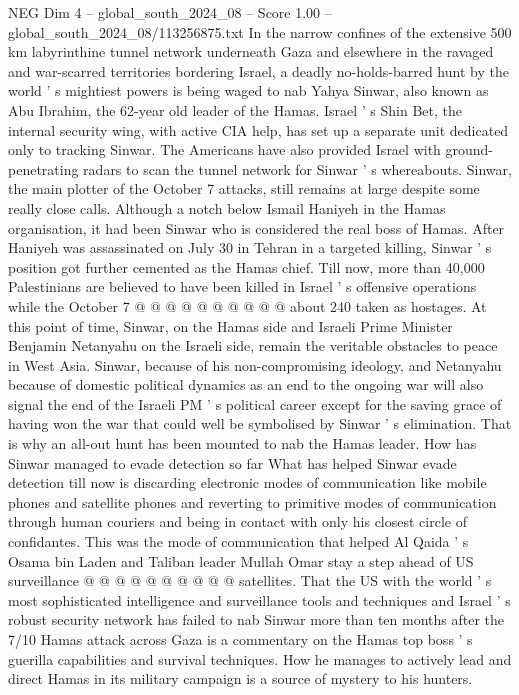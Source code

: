 \begin{textsample}{NEG Dim 4 – global\_south\_2024\_08 – Score 1.00 – global\_south\_2024\_08/113256875.txt}  \label{ex:f4_neg_339}
In the narrow confines of the extensive 500 km labyrinthine tunnel network underneath Gaza and elsewhere in the ravaged and war-scarred territories bordering Israel, a deadly no-holds-barred hunt by the world ' s mightiest powers is being waged to nab Yahya Sinwar, also known as Abu Ibrahim, the 62-year old leader of the Hamas.
Israel ' s Shin Bet, the internal security wing, with active CIA help, has set up a separate unit dedicated only to tracking Sinwar.
The Americans have also provided Israel with ground-penetrating radars to scan the tunnel network for Sinwar ' s whereabouts.
Sinwar, the main plotter of the October 7 attacks, still remains at large despite some really close calls.
Although a notch below Ismail Haniyeh in the Hamas organisation, it had been Sinwar who is considered the real boss of Hamas.
After Haniyeh was assassinated on July 30 in Tehran in a targeted killing, Sinwar ' s position got further cemented as the Hamas chief.
Till now, more than 40,000 Palestinians are believed to have been killed in Israel ' s offensive operations while the October 7 @ @ @ @ @ @ @ @ @ @ about 240 taken as hostages.
At this point of time, Sinwar, on the Hamas side and Israeli Prime Minister Benjamin Netanyahu on the Israeli side, remain the veritable obstacles to peace in West Asia.
Sinwar, because of his non-compromising ideology, and Netanyahu because of domestic political dynamics as an end to the ongoing war will also signal the end of the Israeli PM ' s political career except for the saving grace of having won the war that could well be symbolised by Sinwar ' s elimination.
That is why an all-out hunt has been mounted to nab the Hamas leader.
How has Sinwar managed to evade detection so far What has helped Sinwar evade detection till now is discarding electronic modes of communication like mobile phones and satellite phones and reverting to primitive modes of communication through human couriers and being in contact with only his closest circle of confidantes.
This was the mode of communication that helped Al Qaida ' s Osama bin Laden and Taliban leader Mullah Omar stay a step ahead of US surveillance @ @ @ @ @ @ @ @ @ @ satellites.
That the US with the world ' s most sophisticated intelligence and surveillance tools and techniques and Israel ' s robust security network has failed to nab Sinwar more than ten months after the 7/10 Hamas attack across Gaza is a commentary on the Hamas top boss ' s guerilla capabilities and survival techniques.
How he manages to actively lead and direct Hamas in its military campaign is a source of mystery to his hunters.

\end{textsample}
